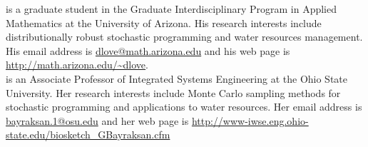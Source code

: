 \documentclass[11pt]{article}
\begin{document}
 is a graduate student in the Graduate Interdisciplinary Program in Applied Mathematics at the University of Arizona.
His research interests include distributionally robust stochastic programming and water resources management.
His email address is \url{dlove@math.arizona.edu} and his web page is \url{http://math.arizona.edu/~dlove}.\\

 is an Associate Professor of Integrated Systems Engineering at the Ohio State University.
Her research interests include Monte Carlo sampling methods for stochastic programming and applications to water resources.
Her email address is \url{bayraksan.1@osu.edu} and her web page is \url{http://www-iwse.eng.ohio-state.edu/biosketch_GBayraksan.cfm}
\end{document}
